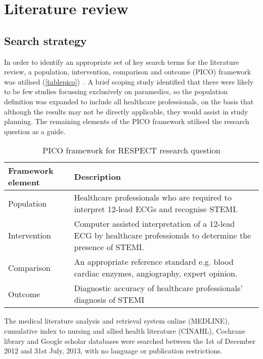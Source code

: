 \chapter{Literature review}
\label{literaturereview}


\section{Search strategy}
\label{searchstrategy}

In order to identify an appropriate set of key search terms for the literature review, a population, intervention, comparison and outcome (PICO) framework was utilised (\autoref{tablepico})~\citep{sayers_tips_2008}. A brief scoping study identified that there were likely to be few studies focussing exclusively on paramedics, so the population definition was expanded to include all healthcare professionals, on the basis that although the results may not be directly applicable, they would assist in study planning. The remaining elements of the PICO framework utilised the research question as a guide.

\begin{table}[htbp]
\begin{minipage}{\linewidth}
\setlength{\tymax}{0.5\linewidth}
\centering
\small
\caption{PICO framework for RESPECT research question}
\label{tablepico}
\begin{tabulary}{\textwidth}{@{}LL@{}} \toprule
\textbf{Framework element}&\textbf{Description}\\
\midrule
Population&Healthcare professionals who are required to interpret 12-lead ECGs and recognise STEMI.\\
Intervention&Computer assisted interpretation of a 12-lead ECG by healthcare professionals to determine the presence of STEMI.\\
Comparison&An appropriate reference standard e.g. blood cardiac enzymes, angiography, expert opinion.\\
Outcome&Diagnostic accuracy of healthcare professionals' diagnosis of STEMI\\

\bottomrule

\end{tabulary}
\end{minipage}
\end{table}


The medical literature analysis and retrieval system online (MEDLINE), cumulative index to nursing and allied health literature (CINAHL), Cochrane library and Google scholar databases were searched between the 1st of December 2012 and 31st July, 2013, with no language or publication restrictions. 

